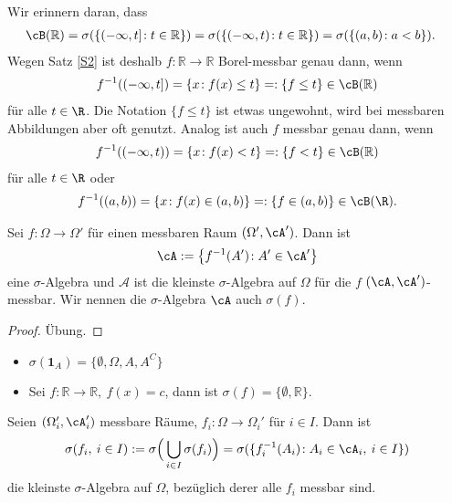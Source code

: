 \begin{bem}
	Wir erinnern daran, dass
	\begin{align*}
		\cB(\mathbb{R}) &= \sigma(\{ (-\infty,t] \! : t \in \mathbb{R} \})= \sigma(\{ (-\infty,t) \! : t \in \mathbb{R} \})= \sigma(\{ (a,b) \! : a < b \}).
	\end{align*}
	Wegen Satz \ref{S2} ist deshalb $f \! : \mathbb{R} \rightarrow \mathbb{R}$ Borel-messbar genau dann, wenn 
	\begin{gather*}
		f^{-1} ((-\infty,t]) = \{ x \! : f(x) \leq t \} =: \{ f \leq t \} \in \cB(\mathbb{R})
	\end{gather*}
	f\"ur alle $t\in\R$. Die Notation $\{f\leq t\}$ ist etwas ungewohnt, wird bei messbaren Abbildungen aber oft genutzt. Analog ist auch $f$ messbar genau dann, wenn
	\begin{align*}
		f^{-1} ((-\infty,t)) = \{ x \! : f(x) < t \} =: \{ f < t \} \in \cB(\mathbb{R})
	\end{align*}
	f\"ur alle $t\in\R$ oder 
	\begin{align*}
		f^{-1} ((a,b)) = \{ x \! : f(x) \in (a,b) \} =: \{ f \in (a,b) \}\in \cB(\mathbb{\R}).
	\end{align*}
\end{bem}

\begin{deff}\label{Kat}
	Sei $f \! : \Omega \rightarrow \Omega'$ für einen messbaren Raum $(\Omega', \cA')$. Dann ist \[ \cA := \big\{ f^{-1}(A') \! : A' \in \cA' \big\} \] eine $\sigma$-Algebra und $\mathcal A$ ist die kleinste $\sigma$-Algebra auf $\Omega$ f\"ur die $f$ $(\cA, \cA')$-messbar. Wir nennen die $\sigma$-Algebra $\cA$ auch $\sigma(f)$.
\end{deff}

\begin{proof}
	Übung.
\end{proof}
\begin{beispiel}\abs
	\begin{itemize}
		\item $\sigma(\mathbf{1}_A) = \{ \emptyset, \Omega, A, A^C \}$
		\item Sei $f \! : \mathbb{R} \rightarrow \mathbb{R}, \: f(x) = c$, dann ist $\sigma(f) = \{ \emptyset, \mathbb{R} \}$.
	\end{itemize}
\end{beispiel}

\begin{deff}
	Seien $(\Omega_i',\cA_i')$ messbare Räume, $f_i \! : \Omega \rightarrow \Omega_i'$ für $i \in I$. Dann ist \[\sigma(f_i, \: i \in I) := \sigma \Big(\bigcup_{i \in I}\sigma(f_i)\Big) = \sigma(\{ f_i^{-1}(A_i) \! : A_i \in \cA_i, \: i \in I \}) \] die kleinste $\sigma$-Algebra auf $\Omega$, bez\"uglich derer alle $f_i$ messbar sind.
\end{deff}

